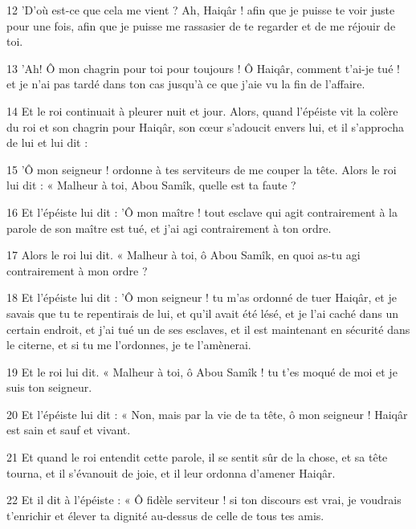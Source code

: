 \par 12 'D'où est-ce que cela me vient ? Ah, Haiqâr ! afin que je puisse te voir juste pour une fois, afin que je puisse me rassasier de te regarder et de me réjouir de toi.

\par 13 'Ah! Ô mon chagrin pour toi pour toujours ! Ô Haiqâr, comment t'ai-je tué ! et je n'ai pas tardé dans ton cas jusqu'à ce que j'aie vu la fin de l'affaire.

\par 14 Et le roi continuait à pleurer nuit et jour. Alors, quand l'épéiste vit la colère du roi et son chagrin pour Haiqâr, son cœur s'adoucit envers lui, et il s'approcha de lui et lui dit :

\par 15 'Ô mon seigneur ! ordonne à tes serviteurs de me couper la tête. Alors le roi lui dit : « Malheur à toi, Abou Samîk, quelle est ta faute ?

\par 16 Et l'épéiste lui dit : 'Ô mon maître ! tout esclave qui agit contrairement à la parole de son maître est tué, et j'ai agi contrairement à ton ordre.

\par 17 Alors le roi lui dit. « Malheur à toi, ô Abou Samîk, en quoi as-tu agi contrairement à mon ordre ?

\par 18 Et l'épéiste lui dit : 'Ô mon seigneur ! tu m'as ordonné de tuer Haiqâr, et je savais que tu te repentirais de lui, et qu'il avait été lésé, et je l'ai caché dans un certain endroit, et j'ai tué un de ses esclaves, et il est maintenant en sécurité dans le citerne, et si tu me l'ordonnes, je te l'amènerai.

\par 19 Et le roi lui dit. « Malheur à toi, ô Abou Samîk ! tu t'es moqué de moi et je suis ton seigneur.

\par 20 Et l'épéiste lui dit : « Non, mais par la vie de ta tête, ô mon seigneur ! Haiqâr est sain et sauf et vivant.

\par 21 Et quand le roi entendit cette parole, il se sentit sûr de la chose, et sa tête tourna, et il s'évanouit de joie, et il leur ordonna d'amener Haiqâr.

\par 22 Et il dit à l'épéiste : « Ô fidèle serviteur ! si ton discours est vrai, je voudrais t'enrichir et élever ta dignité au-dessus de celle de tous tes amis.

